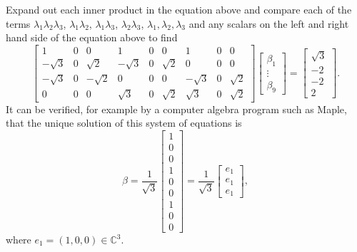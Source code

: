 \documentclass[11pt, reqno]{amsart}
\newcommand\1{\boldsymbol {1}}
\numberwithin{equation}{section}
\begin{document}
Expand out each inner product in the equation above and compare each of the terms $\lambda_{1}\lambda_{2}\lambda_{3}$, $\lambda_{1}\lambda_{2}$, $\lambda_{1}\lambda_{3}$, $\lambda_{2}\lambda_{3}$, $\lambda_{1},\lambda_{2},\lambda_{3}$ and any scalars on the left and right hand side of the equation above to find
$$\begin{bmatrix}
    1 & 0 & 0 & 1 & 0 & 0 & 1 & 0 & 0\\
    -\sqrt{3} & 0 & \sqrt{2} & -\sqrt{3} & 0 & \sqrt{2} & 0&0&0\\
    -\sqrt{3} & 0 & -\sqrt{2} & 0&0&0&-\sqrt{3}&0&\sqrt{2}\\
    0&0&0&\sqrt{3} &0&\sqrt{2}&\sqrt{3}&0&\sqrt{2}
\end{bmatrix}\begin{bmatrix}
    \beta_{1}\\
    \vdots\\
    \beta_{9}
\end{bmatrix}=\begin{bmatrix}
    \sqrt{3}\\
    -2\\
    -2\\
    2
\end{bmatrix}.$$
It can be verified, for example by a computer algebra program such as Maple, that the unique solution of this system of equations is
\begin{equation}\label{beta}
\beta = \dfrac{1}{\sqrt{3}}\begin{bmatrix}
    1 \\
    0\\
    0\\
    1\\
    0\\
    0\\
    1\\
    0\\
    0
\end{bmatrix} = \dfrac{1}{\sqrt{3}}\begin{bmatrix}
    e_{1}\\
    e_{1}\\
    e_{1}
\end{bmatrix},
\end{equation}
where $e_{1}=(1,0,0)\in\mathbb{C}^{3}$.
\end{document}
